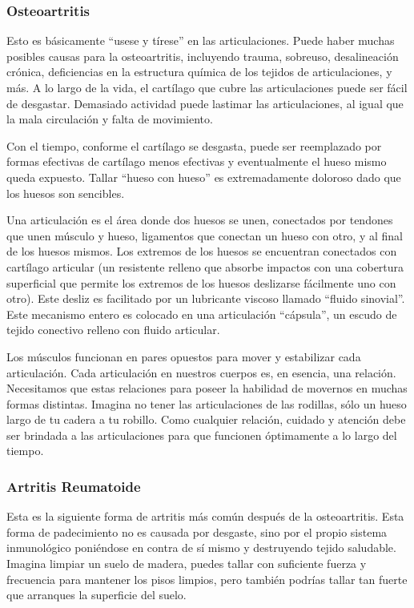 \subsubsection{Osteoartritis}
Esto es básicamente ``usese y tírese'' en las articulaciones. Puede haber muchas posibles causas para la osteoartritis, incluyendo trauma, sobreuso, desalineación crónica, deficiencias en la estructura química de los tejidos de articulaciones, y más. A lo largo de la vida, el cartílago que cubre las articulaciones puede ser fácil de desgastar. Demasiado actividad puede lastimar las articulaciones, al igual que la mala circulación y falta de movimiento.

Con el tiempo, conforme el cartílago se desgasta, puede ser reemplazado por formas efectivas de cartílago menos efectivas y eventualmente el hueso mismo queda expuesto. Tallar ``hueso con hueso'' es extremadamente doloroso dado que los huesos son sencibles.

Una articulación es el área donde dos huesos se unen, conectados por tendones que unen músculo y hueso, ligamentos que conectan un hueso con otro, y al final de los huesos mismos. Los extremos de los huesos se encuentran conectados con cartílago articular (un resistente relleno que absorbe impactos con una cobertura superficial que permite los extremos de los huesos deslizarse fácilmente uno con otro). Este desliz es facilitado por un lubricante viscoso llamado ``fluido sinovial''. Este mecanismo entero es colocado en una articulación ``cápsula'', un escudo de tejido conectivo relleno con fluido articular.

Los músculos funcionan en pares opuestos para mover y estabilizar cada articulación. Cada articulación en nuestros cuerpos es, en esencia, una relación. Necesitamos que estas relaciones para poseer la habilidad de movernos en muchas formas distintas. Imagina no tener las articulaciones de las rodillas, sólo un hueso largo de tu cadera a tu robillo. Como cualquier relación, cuidado y atención debe ser brindada a las articulaciones para que funcionen óptimamente a lo largo del tiempo.

\subsubsection{Artritis Reumatoide}
Esta es la siguiente forma de artritis más común despu\'es de la osteoartritis. Esta forma de padecimiento no es causada por desgaste, sino por el propio sistema inmunológico poni\'endose en contra de sí mismo y destruyendo tejido saludable. Imagina limpiar un suelo de madera, puedes tallar con suficiente fuerza y frecuencia para mantener los pisos limpios, pero tambi\'en podrías tallar tan fuerte que arranques la superficie del suelo.

